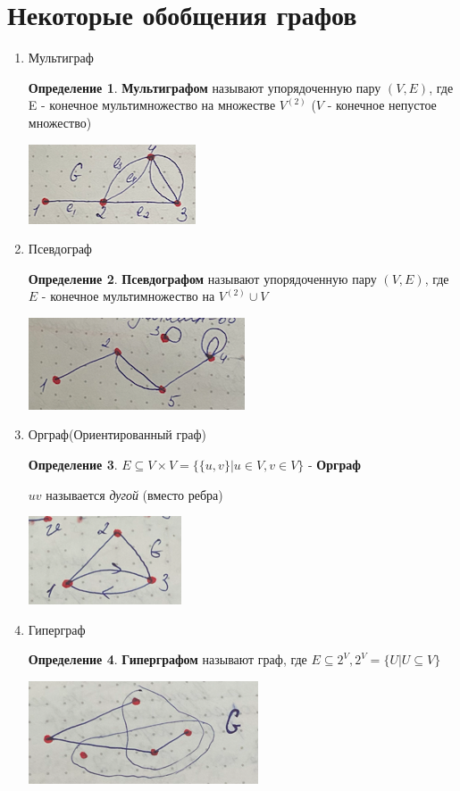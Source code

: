 \documentclass[a4paper, 12pt]{article}
\theoremstyle{definition}
\newtheorem*{definition*}{Определение}
\theoremstyle{definition}
\begin{document}
  \section{Некоторые обобщения графов}
  \begin{enumerate}
    \item Мультиграф
    
    \begin{definition*}
      \textbf{Мультиграфом} называют упорядоченную пару $(V,E)$, где E - конечное мультимножество на множестве $V^{(2)}$ ($V$ - конечное непустое множество)

      \includegraphics{image.png}
    \end{definition*}
    \item Псевдограф
    
    \begin{definition*}
      \textbf{Псевдографом} называют упорядоченную пару $(V,E)$, где $E$ - конечное мультимножество на $V^{(2)}\cup V$

      \includegraphics{pseudo.png}
    \end{definition*}
    \item Орграф(Ориентированный граф)
    
    \begin{definition*}
      $E\subseteq V\times V=\{\{u,v\}|u\in V, v\in V\}$ - \textbf{Орграф}

      $uv$ называется \textit{дугой} (вместо ребра)

      \includegraphics{Org.png}
    \end{definition*}
    \item Гиперграф
    
    \begin{definition*}
      \textbf{Гиперграфом} называют граф, где $E\subseteq2^V,2^V=\{U|U\subseteq V\}$

      \includegraphics{Hyper.png}
    \end{definition*}
  \end{enumerate}
\end{document}
